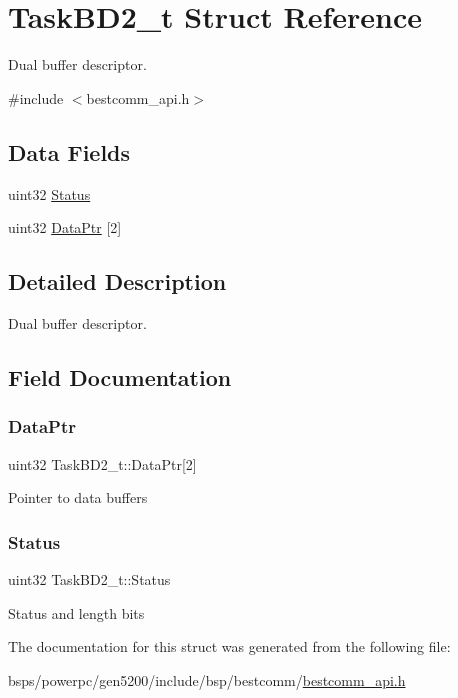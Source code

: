 \hypertarget{structTaskBD2__t}{}\section{Task\+B\+D2\+\_\+t Struct Reference}
\label{structTaskBD2__t}


Dual buffer descriptor.  




{\ttfamily \#include $<$bestcomm\+\_\+api.\+h$>$}

\subsection*{Data Fields}
\begin{DoxyCompactItemize}
\item 
uint32 \mbox{\hyperlink{structTaskBD2__t_a9feca14c7cd775b48fca09bbdd93fe4c}{Status}}
\item 
uint32 \mbox{\hyperlink{structTaskBD2__t_a8634d12a47320c4fa2128c54fa1ba3be}{Data\+Ptr}} \mbox{[}2\mbox{]}
\end{DoxyCompactItemize}


\subsection{Detailed Description}
Dual buffer descriptor. 

\subsection{Field Documentation}
\mbox{\label{structTaskBD2__t_a8634d12a47320c4fa2128c54fa1ba3be}} 
\subsubsection{\texorpdfstring{DataPtr}{DataPtr}}
{\footnotesize\ttfamily uint32 Task\+B\+D2\+\_\+t\+::\+Data\+Ptr\mbox{[}2\mbox{]}}

Pointer to data buffers \mbox{\label{structTaskBD2__t_a9feca14c7cd775b48fca09bbdd93fe4c}} 
\subsubsection{\texorpdfstring{Status}{Status}}
{\footnotesize\ttfamily uint32 Task\+B\+D2\+\_\+t\+::\+Status}

Status and length bits 

The documentation for this struct was generated from the following file\+:\begin{DoxyCompactItemize}
\item 
bsps/powerpc/gen5200/include/bsp/bestcomm/\mbox{\hyperlink{bestcomm__api_8h}{bestcomm\+\_\+api.\+h}}\end{DoxyCompactItemize}
